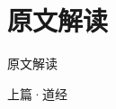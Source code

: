 \documentclass{beamer}
\begin{document}



\section{原文解读}
\begin{frame}{原文解读}
	\begin{center}
		{\large\calligra 上篇·道经}
	\end{center}
\end{frame}
\end{document}
